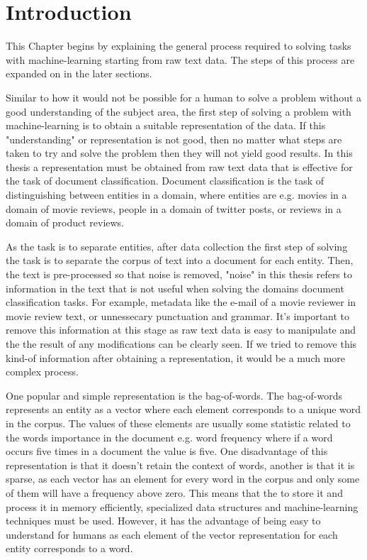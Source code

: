 
\section{Introduction}

This Chapter begins by explaining the general process required to solving tasks with machine-learning starting from raw text data. The steps of this process are expanded on in the later sections.


Similar to how it would not be possible for a human to solve a problem without a good understanding of the subject area, the first step of solving a problem with  machine-learning  is to obtain a suitable  representation of the data. If this "understanding" or representation is not good, then no matter what steps are taken to try and solve the problem then they will not yield good results. In this thesis a representation must be obtained from raw text data that is effective for the task of document classification. Document classification is the task of distinguishing between entities in a domain, where entities are e.g. movies in a domain of movie reviews, people in a domain of twitter posts, or reviews in a domain of product reviews. 

As the task is to separate entities, after data collection the first step of solving the task is to separate the corpus of text into a document for each entity. Then, the text is pre-processed so that noise is removed, "noise" in this thesis refers to information in the text that is not useful when solving the domains document classification tasks. For example, metadata like the e-mail of a movie reviewer in movie review text, or unnessecary punctuation and grammar. It's important to remove this information at this stage as raw text data is easy to manipulate and the the result of any modifications can be clearly seen. If we tried to remove this kind-of information after obtaining a representation, it would be a much more complex process.

One popular and simple representation is the bag-of-words. The bag-of-words  represents an entity as a vector where each element corresponds to a unique word in the corpus. The values of these elements are usually some statistic related to the words importance in the document e.g. word frequency where if a word occurs five times in a document the value is five. One disadvantage of this representation is that it doesn't retain the context of words, another is that it is sparse, as each vector has an element for every word in the corpus and only some of them will have a frequency above zero. This means that the to store it and process it in memory efficiently, specialized data structures and machine-learning techniques must be used. However, it has the advantage of being easy to understand for humans as each element of the vector representation for each entity corresponds to a word. 

